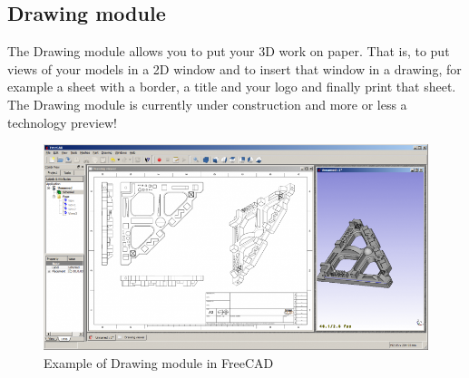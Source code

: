 \subsection{Drawing module}
The Drawing module allows you to put your 3D work on paper. That is, to 
put views of your models in a 2D window and to insert that window in a drawing, 
for example a sheet with a border, a title and your logo and finally print that 
sheet. The Drawing module is currently under construction and more or less 
a technology preview!
\begin{figure}[h!]                                                       
\begin{center}                                                          
\includegraphics[scale=0.5]{images/Drawing_extraction.png}                     
\caption{Example of Drawing module in FreeCAD}                           \end{center}
\end{figure}

